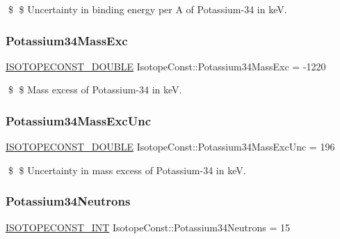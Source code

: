 \$ \$ Uncertainty in binding energy per A of Potassium-\/34 in keV. \mbox{\label{group___isotope_const-_potassium-_k34_gad91735a3fe86f914f8c8f7aa4d08d002}} 
\subsubsection{\texorpdfstring{Potassium34\+Mass\+Exc}{Potassium34MassExc}}
{\footnotesize\ttfamily \mbox{\hyperlink{group___isotope_const-_macros_ga8f45a7272ce02c0b4c65c44636ed719a}{I\+S\+O\+T\+O\+P\+E\+C\+O\+N\+S\+T\+\_\+\+D\+O\+U\+B\+LE}} Isotope\+Const\+::\+Potassium34\+Mass\+Exc = -\/1220}

\$ \$ Mass excess of Potassium-\/34 in keV. \mbox{\label{group___isotope_const-_potassium-_k34_gac1837d51fa977d5c39cd1ad815d2fcc3}} 
\subsubsection{\texorpdfstring{Potassium34\+Mass\+Exc\+Unc}{Potassium34MassExcUnc}}
{\footnotesize\ttfamily \mbox{\hyperlink{group___isotope_const-_macros_ga8f45a7272ce02c0b4c65c44636ed719a}{I\+S\+O\+T\+O\+P\+E\+C\+O\+N\+S\+T\+\_\+\+D\+O\+U\+B\+LE}} Isotope\+Const\+::\+Potassium34\+Mass\+Exc\+Unc = 196}

\$ \$ Uncertainty in mass excess of Potassium-\/34 in keV. \mbox{\label{group___isotope_const-_potassium-_k34_ga3958c7acf4c13e5eb5131838068e0934}} 
\subsubsection{\texorpdfstring{Potassium34\+Neutrons}{Potassium34Neutrons}}
{\footnotesize\ttfamily \mbox{\hyperlink{group___isotope_const-_macros_ga5f18360b3e99483a35c32d789e62621c}{I\+S\+O\+T\+O\+P\+E\+C\+O\+N\+S\+T\+\_\+\+I\+NT}} Isotope\+Const\+::\+Potassium34\+Neutrons = 15}

